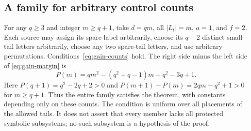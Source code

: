 \documentclass[11pt,reqno]{amsart}
\numberwithin{equation}{section}
\theoremstyle{definition}
\begin{document}
\subsection{A family for arbitrary control counts}
For any $q\ge3$ and integer $m\ge q+1$, take $d=qm$,
all $|L_t|=m$, $a=1$, and $f=2$. Each source may assign
its spare label arbitrarily, choose its $q-2$ distinct small-tail
letters arbitrarily, choose any two spare-tail letters, and use
arbitrary permutations. Conditions~\eqref{eq:gain-counts} hold.
The right side minus the left side of \eqref{eq:gain-margin} is
\[
 P(m)=qm^2-(q^2+q-1)m+q^2-3q+1.
\]
Here $P(q+1)=q^2-2q+2>0$ and
$P(m+1)-P(m)=2qm-q^2+1>0$ for $m\ge q+1$.
Thus the entire family satisfies the theorem, with constants
depending only on these counts. The condition is uniform over all placements of the allowed tails.
It does not assert that every member lacks all protected symbolic
subsystems; no such subsystem is a hypothesis of the proof.
\end{document}
